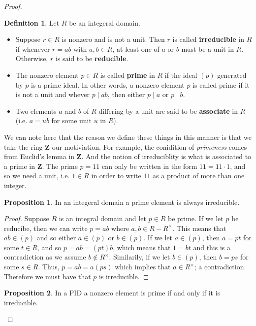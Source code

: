 \documentclass[9pt,reqno]{amsart}
\theoremstyle{definition}
\newtheorem{defi}{Definition}[section]
\newtheorem{prop}{Proposition}[section]
\newcommand{\zz}{\mathbf Z}
\begin{document}
\begin{proof}
\begin{defi}
Let $R$ be an integeral domain.
\begin{itemize}
	\item Suppose $r \in R$ is nonzero and is not a unit. Then $r$ is called \textbf{irreducible} in $R$ if whenever $r = ab$ with $a, b \in R$, at least one of $a$ or $b$ must be a unit in $R$. Otherwise, $r$ is said to be \textbf{reducible}. 
	\item The nonzero element $p \in R$ is called \textbf{prime} in $R$ if the ideal $(p)$ generated by $p$ is a prime ideal. In other words, a nonzero element $p$ is called prime if it is not a unit and whever $p \mid ab$, then either $p \mid a $ or $p \mid b$.
	\item Two elements $a$ and $b$ of $R$ differing by a unit are said to be \textbf{associate} in $R$ \\ (i.e. $a = ub$ for some unit $u$ in $R$). 
\end{itemize}	
\end{defi}
We can note here that the reason we define these things in this manner is that we take the ring $\zz$ our motiviation. For example, the conidition of \textit{primeness} comes from Euclid's lemma in $\zz$. And the notion of irreduciblity is what is associated to a prime in $\zz$. The prime $p = 11$ can only be written in the form $11 = 11 \cdot 1$, and so we need a unit, i.e. $1 \in R$ in order to write $11$ as a product of more than one integer. 
\begin{prop}
	In an integeral domain a prime element is always irreducible.
\end{prop}
\begin{proof}
	Suppose $R$ is an integral domain and let $p \in R$ be prime. If we let $p$ be reducibe, then we can write $p = ab$ where $a, b \in R - R^\times$. This means that $ab \in (p)$ and so either $a \in (p)$ or $b \in (p)$. If we let $a \in (p)$, then $a = pt $ for some $t \in R$, and so $p = ab = (pt ) b$, which means that $1 = bt$ and this is a contradiction as we assume $b \notin R^\times$. Similarily, if we let $b \in (p)$, then $b = ps$ for some $s \in R$. Thus, $p = ab = a (ps)$ which implies that $a \in R^\times$; a contradiction. Therefore we must have that $p$ is irreducible. 
\end{proof}
\begin{prop}
	In a PID a nonzero element is prime if and only if it is irreducible.
\end{prop}


\end{proof}
\end{document}
